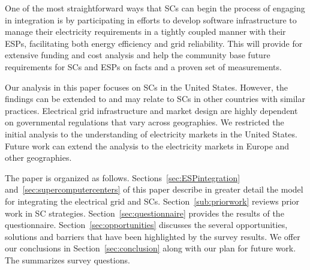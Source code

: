 
One of the most straightforward ways that SCs can begin
the process of engaging %
in integration is by participating in efforts to
develop software 
infrastructure to manage their electricity requirements in a tightly coupled manner 
with their ESPs, facilitating both energy efficiency and grid reliability. %
This will provide for extensive funding and cost analysis and help the community base future requirements for SCs and ESPs on facts and a proven set of measurements.

Our analysis in this paper focuses %
on SCs in the United States. However, 
the findings can be extended to and may relate to SCs in other countries with similar practices. 
Electrical grid infrastructure and market design are highly dependent on %
governmental regulations that vary across geographies. We restricted the initial analysis to the understanding of 
electricity markets in the United States. Future work can extend the analysis to the electricity markets in Europe and other geographies.

The paper is organized as follows.
Sections~\ref{sec:ESPintegration} and~\ref{sec:supercomputercenters} of this paper
describe in greater detail the model for 
integrating the electrical grid and SCs.
Section~\ref{sub:priorwork}
reviews prior work in SC strategies. %
Section~\ref{sec:questionnaire} provides the results of the questionnaire. 
Section~\ref{sec:opportunities} 
discusses the several opportunities, solutions and barriers that have been highlighted
by the survey results. We offer our conclusions in Section~\ref{sec:conclusion} along with our plan for future work. %
The  summarizes survey questions.
